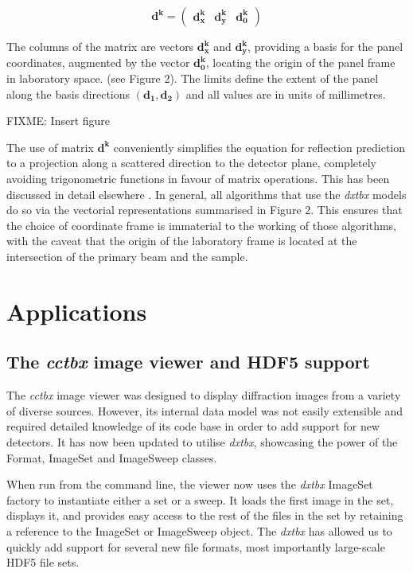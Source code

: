 \documentclass[preprint]{iucr}
\newcommand{\cctbx}{\emph{cctbx}\xspace}
\newcommand{\dxtbx}{\emph{dxtbx}\xspace}
\begin{document}
\begin{equation}
  \bm{d^k} = 
    \begin{pmatrix}
        \bm{d^k_x} & \bm{d^k_y} & \bm{d^k_0}
    \end{pmatrix}
\end{equation}

The columns of the matrix are vectors \(\bm{d^k_x}\) and \(\bm{d^k_y}\), 
providing a basis for the panel coordinates, augmented by the vector 
\(\bm{d^k_0}\), locating the origin of the panel frame in laboratory space. 
(see Figure 2). The limits define the extent of the panel along the basis 
directions \((\bm{d_1}, \bm{d_2})\) and all values are in units of millimetres.

FIXME: Insert figure

The use of matrix \(\bm{d^k}\) conveniently simplifies the equation for reflection 
prediction to a projection along a scattered direction to the detector plane, 
completely avoiding trigonometric functions in favour of matrix operations. This 
has been discussed in detail elsewhere \cite{Thomas1992}. In general, all algorithms 
that use the \dxtbx models do so via the vectorial representations summarised in 
Figure 2. This ensures that the choice of coordinate frame is immaterial to the 
working of those algorithms, with the caveat that the origin of the laboratory 
frame is located at the intersection of the primary beam and the sample.

\section{Applications}

\subsection{The \cctbx image viewer and HDF5 support}

The \cctbx image viewer was designed to display diffraction images from a variety 
of diverse sources.  However, its internal data model was not easily extensible 
and required detailed knowledge of its code base in order to add support for new 
detectors. It has now been updated to utilise \dxtbx, showcasing the power of 
the Format, ImageSet and ImageSweep classes. 

When run from the command line, the viewer now uses the \dxtbx ImageSet factory 
to instantiate either a set or a sweep. It loads the first image in the set, 
displays it, and provides easy access to the rest of the files in the set by 
retaining a reference to the ImageSet or ImageSweep object. The \dxtbx has
allowed us to quickly add support for several new file formats, most importantly 
large-scale HDF5 file sets.
\end{document}
